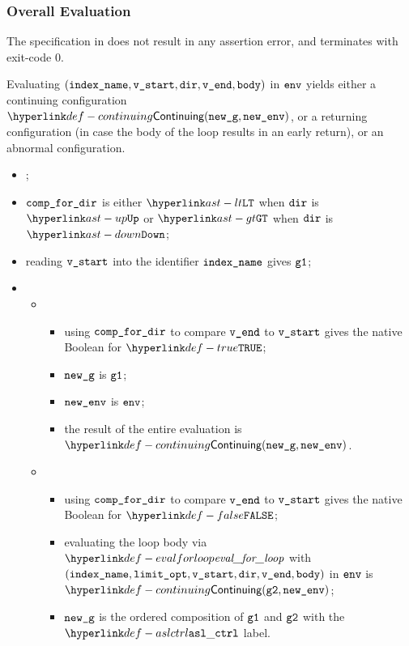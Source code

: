 \subsubsection{Overall Evaluation}
The specification in 
does not result in any assertion error, and terminates with exit-code $0$.

Evaluating $(\texttt{index\_name}, \texttt{v\_start}, \texttt{dir}, \texttt{v\_end}, \texttt{body})$ in $\texttt{env}$ yields either
a continuing configuration $\Continuing(\newg, \newenv)$, or a returning configuration
(in case the body of the loop results in an early return),
or an abnormal configuration.

\AllApply
\begin{itemize}
  \item \Proseticklooplimit{$\vlimitopt$}{$\vnextlimitopt$}\ProseOrError;
  \item $\texttt{comp\_for\_dir}$ is either $\LT$ when $\texttt{dir}$ is $\UP$ or $\GT$ when $\texttt{dir}$ is $\DOWN$;
  \item reading $\texttt{v\_start}$ into the identifier $\texttt{index\_name}$ gives $\texttt{g1}$;
  \item \OneApplies
    \begin{itemize}
    \item {}
    \begin{itemize}
      \item using $\texttt{comp\_for\_dir}$ to compare $\texttt{v\_end}$ to $\texttt{v\_start}$ gives the native Boolean for $\True$;
      \item $\texttt{new\_g}$ is $\texttt{g1}$;
      \item $\texttt{new\_env}$ is $\texttt{env}$;
      \item the result of the entire evaluation is $\Continuing(\newg, \newenv)$.
    \end{itemize}
    \item {}
    \begin{itemize}
      \item using $\texttt{comp\_for\_dir}$ to compare $\texttt{v\_end}$ to $\texttt{v\_start}$ gives the native Boolean for $\False$;
      \item evaluating the loop body via $\evalforloop$ with \\ $(\texttt{index\_name}, \texttt{limit\_opt}, \texttt{v\_start}, \texttt{dir}, \texttt{v\_end}, \texttt{body})$
      in $\texttt{env}$ is \\ $\Continuing(\vgtwo, \newenv)$\ProseTerminateAs{\ReturningConfig, \ThrowingConfig, \DynErrorConfig};
      \item $\texttt{new\_g}$ is the ordered composition of $\texttt{g1}$ and $\texttt{g2}$ with the $\aslctrl$ label.
    \end{itemize}
  \end{itemize}
\end{itemize}

